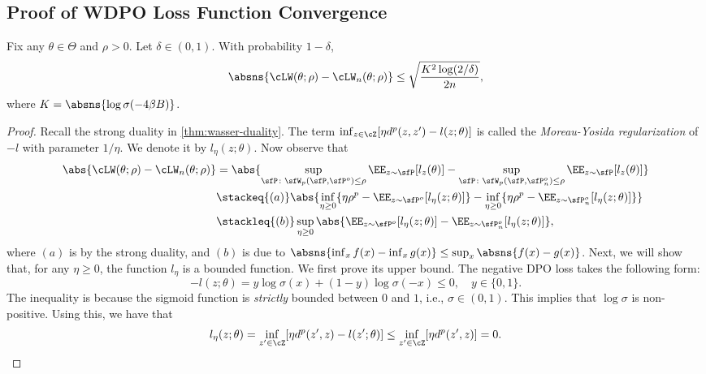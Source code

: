 \subsection{Proof of WDPO Loss Function Convergence}\label{sec:proof-of-loss-function-convergence}
\begin{lemma}\label{lem:convergence-of-wdpo-loss}
    Fix any $\theta\in\Theta$ and $\rho>0$. Let $\delta\in(0,1)$. With probability $1-\delta$, 
    \begin{equation*}
        \absns{\cLW(\theta;\rho)-\cLW_n(\theta;\rho)} \leq \sqrt{\frac{K^2\log(2/\delta)}{2n}},
    \end{equation*}
    where $K=\absns{\log\sigma(-4\beta B)}$.
\end{lemma}
\begin{proof}
    Recall the strong duality in \cref{thm:wasser-duality}. The term $\inf_{z\in\cZ} [\eta d^p(z,z') - l(z;\theta)]$ is called the \textit{Moreau-Yosida regularization} of $-l$ with parameter $1/\eta$. We denote it by $l_\eta(z;\theta)$. Now observe that
    \begin{align*}
        \abs{\cLW(\theta;\rho)-\cLW_n(\theta;\rho)} &= \abs{\sup_{\sfP\colon \sfW_p(\sfP,\sfP^o)\leq \rho} \EE_{z\sim\sfP} [l_z(\theta)] - \sup_{\sfP\colon \sfW_p(\sfP,\sfP^o_n)\leq \rho} \EE_{z\sim\sfP} [l_z(\theta)]} \\
        &\stackeq{(a)} \abs{\inf_{\eta\geq 0} \{\eta\rho^p - \EE_{z\sim\sfP^o}[l_\eta(z;\theta)]\} - \inf_{\eta\geq 0} \{\eta\rho^p - \EE_{z\sim\sfP_n^o}[l_\eta(z;\theta)]\}} \\
        &\stackleq{(b)} \sup_{\eta\geq 0} \abs{\EE_{z\sim \sfP^o}[l_\eta(z;\theta)] - \EE_{z\sim \sfP^o_n}[l_\eta(z;\theta)]},
    \end{align*}
    where $(a)$ is by the strong duality, and $(b)$ is due to $\absns{\inf_x f(x) - \inf_x g(x)}\leq \sup_x \absns{f(x)-g(x)}$. Next, we will show that, for any $\eta\geq 0$, the function $l_\eta$ is a bounded function. We first prove its upper bound. The negative DPO loss takes the following form:
    \begin{equation*}
        -l(z;\theta) = y\log\sigma(x) + (1-y)\log\sigma(-x)\leq 0, \quad y\in\{0,1\}.
    \end{equation*}
    The inequality is because the sigmoid function is \textit{strictly} bounded between $0$ and $1$, i.e., $\sigma\in(0,1)$. This implies that $\log\sigma$ is non-positive. Using this, we have that
    \begin{equation*}
        l_\eta(z;\theta) = \inf_{z'\in\cZ}[\eta d^p(z',z)-l(z';\theta)] \leq  \inf_{z'\in\cZ}[\eta d^p(z',z)] = 0.

\end{equation*}
\end{proof}

